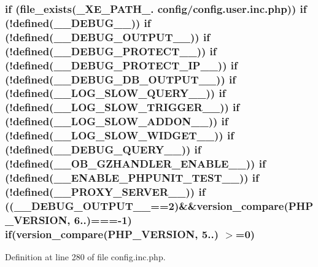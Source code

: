 \subsubsection[{\texorpdfstring{if}{if}}]{\setlength{\rightskip}{0pt plus 5cm}if (file\+\_\+exists(\+\_\+\+X\+E\+\_\+\+P\+A\+T\+H\+\_\+. \textquotesingle{}config/config.\+user.\+inc.\+php\textquotesingle{})) if (!defined(\textquotesingle{}\+\_\+\+\_\+\+D\+E\+B\+U\+G\+\_\+\+\_\+\textquotesingle{})) if (!defined(\textquotesingle{}\+\_\+\+\_\+\+D\+E\+B\+U\+G\+\_\+\+O\+U\+T\+P\+U\+T\+\_\+\+\_\+\textquotesingle{})) if (!defined(\textquotesingle{}\+\_\+\+\_\+\+D\+E\+B\+U\+G\+\_\+\+P\+R\+O\+T\+E\+C\+T\+\_\+\+\_\+\textquotesingle{})) if (!defined(\textquotesingle{}\+\_\+\+\_\+\+D\+E\+B\+U\+G\+\_\+\+P\+R\+O\+T\+E\+C\+T\+\_\+\+I\+P\+\_\+\+\_\+\textquotesingle{})) if (!defined(\textquotesingle{}\+\_\+\+\_\+\+D\+E\+B\+U\+G\+\_\+\+D\+B\+\_\+\+O\+U\+T\+P\+U\+T\+\_\+\+\_\+\textquotesingle{})) if (!defined(\textquotesingle{}\+\_\+\+\_\+\+L\+O\+G\+\_\+\+S\+L\+O\+W\+\_\+\+Q\+U\+E\+R\+Y\+\_\+\+\_\+\textquotesingle{})) if (!defined(\textquotesingle{}\+\_\+\+\_\+\+L\+O\+G\+\_\+\+S\+L\+O\+W\+\_\+\+T\+R\+I\+G\+G\+E\+R\+\_\+\+\_\+\textquotesingle{})) if (!defined(\textquotesingle{}\+\_\+\+\_\+\+L\+O\+G\+\_\+\+S\+L\+O\+W\+\_\+\+A\+D\+D\+O\+N\+\_\+\+\_\+\textquotesingle{})) if (!defined(\textquotesingle{}\+\_\+\+\_\+\+L\+O\+G\+\_\+\+S\+L\+O\+W\+\_\+\+W\+I\+D\+G\+E\+T\+\_\+\+\_\+\textquotesingle{})) if (!defined(\textquotesingle{}\+\_\+\+\_\+\+D\+E\+B\+U\+G\+\_\+\+Q\+U\+E\+R\+Y\+\_\+\+\_\+\textquotesingle{})) if (!defined(\textquotesingle{}\+\_\+\+\_\+\+O\+B\+\_\+\+G\+Z\+H\+A\+N\+D\+L\+E\+R\+\_\+\+E\+N\+A\+B\+L\+E\+\_\+\+\_\+\textquotesingle{})) if (!defined(\textquotesingle{}\+\_\+\+\_\+\+E\+N\+A\+B\+L\+E\+\_\+\+P\+H\+P\+U\+N\+I\+T\+\_\+\+T\+E\+S\+T\+\_\+\+\_\+\textquotesingle{})) if (!defined(\textquotesingle{}\+\_\+\+\_\+\+P\+R\+O\+X\+Y\+\_\+\+S\+E\+R\+V\+E\+R\+\_\+\+\_\+\textquotesingle{})) if ((\+\_\+\+\_\+\+D\+E\+B\+U\+G\+\_\+\+O\+U\+T\+P\+U\+T\+\_\+\+\_\+==2)\&\&version\+\_\+compare(P\+H\+P\+\_\+\+V\+E\+R\+S\+I\+ON, \textquotesingle{}6..\textquotesingle{})===-\/1) if(version\+\_\+compare(P\+H\+P\+\_\+\+V\+E\+R\+S\+I\+ON, \textquotesingle{}5..\textquotesingle{}) $>$=0)}\hypertarget{config_8inc_8php_ac202e21c80d0f28d495d074d3c23e1ca}{}\label{config_8inc_8php_ac202e21c80d0f28d495d074d3c23e1ca}


Definition at line 280 of file config.\+inc.\+php.


